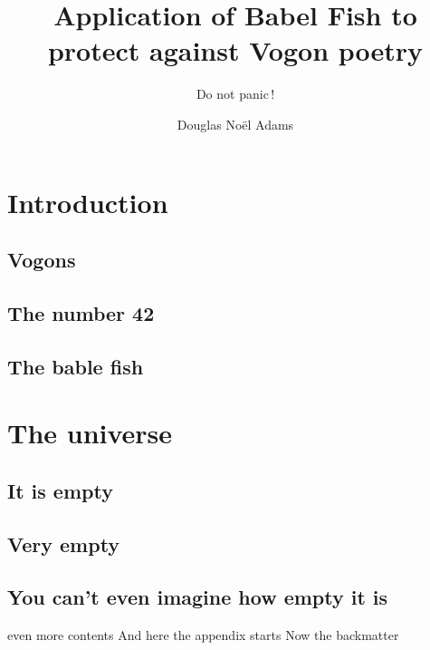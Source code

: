 \documentclass[twoside]{JenThesis}
\author{Douglas Noël Adams}
\title{Application of Babel Fish to protect against Vogon poetry}
\subtitle{Do not panic\,!}
\begin{document}
	
	\frontmatter
		\autofrontmatter
	\mainmatter
		\chapter{Introduction}
			\lipsum[1-2]
			\section{Vogons}
				\lipsum[3-4]
			\section{The number 42}
				\lipsum[5-6]
			\section{The bable fish}
				\lipsum[7-8]
		\chapter{The universe}
			\lipsum[9]
			\section{It is empty}
				\lipsum[10-11]
			\section{Very empty}
				\lipsum[12-13]
			\section{You can't even imagine how empty it is}
				\lipsum[14-15]
			even more contents
	\appendix
		And here the appendix starts
	\backmatter
		Now the backmatter
		
\end{document}
